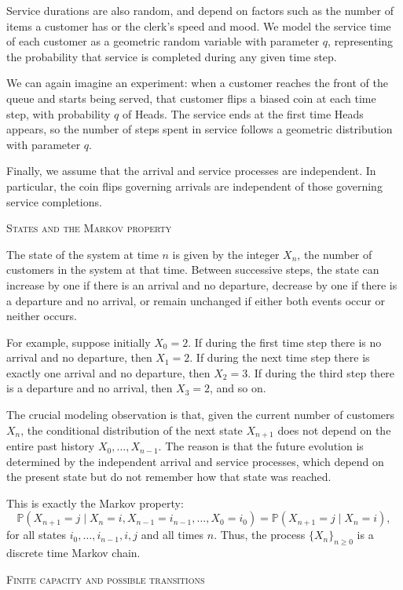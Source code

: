 Service durations are also random, and depend on factors such as the number of items a customer has or the clerk's speed and mood.
We model the service time of each customer as a geometric random variable with parameter \(q\), representing the probability that service is completed during any given time step.

We can again imagine an experiment: when a customer reaches the front of the queue and starts being served, that customer flips a biased coin at each time step, with probability \(q\) of Heads.
The service ends at the first time Heads appears, so the number of steps spent in service follows a geometric distribution with parameter \(q\).

Finally, we assume that the arrival and service processes are independent.
In particular, the coin flips governing arrivals are independent of those governing service completions.

\bigskip
\textsc{States and the Markov property}

The state of the system at time \(n\) is given by the integer \(X_n\), the number of customers in the system at that time.
Between successive steps, the state can increase by one if there is an arrival and no departure, decrease by one if there is a departure and no arrival, or remain unchanged if either both events occur or neither occurs.

For example, suppose initially \(X_0 = 2\).
If during the first time step there is no arrival and no departure, then \(X_1 = 2\).
If during the next time step there is exactly one arrival and no departure, then \(X_2 = 3\).
If during the third step there is a departure and no arrival, then \(X_3 = 2\), and so on.

The crucial modeling observation is that, given the current number of customers \(X_n\), the conditional distribution of the next state \(X_{n+1}\) does not depend on the entire past history \(X_0,\dots,X_{n-1}\).
The reason is that the future evolution is determined by the independent arrival and service processes, which depend on the present state but do not remember how that state was reached.

This is exactly the Markov property:
\[
\mathbb{P}(X_{n+1} = j \mid X_n = i, X_{n-1} = i_{n-1}, \dots, X_0 = i_0)
=
\mathbb{P}(X_{n+1} = j \mid X_n = i),
\]
for all states \(i_0,\dots,i_{n-1},i,j\) and all times \(n\).
Thus, the process \(\{X_n\}_{n \ge 0}\) is a discrete time Markov chain.

\bigskip
\textsc{Finite capacity and possible transitions}

